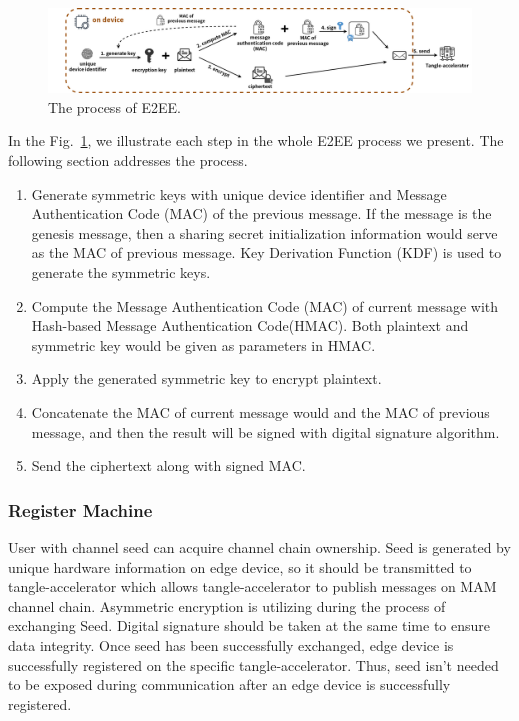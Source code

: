 \documentclass[conference]{IEEEtran}
\begin{document}
\begin{figure}[!t]
    \centering
    \includegraphics[width=\linewidth]{MAM_E2EE}
    \caption{The process of E2EE.}
    \label{fig:MAM_E2EE}
\end{figure}

In the Fig.~\ref{fig:MAM_E2EE}, we illustrate each step in the whole E2EE process we present. The following section addresses the process.

\begin{enumerate}
    \item Generate symmetric keys with unique device identifier and Message Authentication Code (MAC) of the previous message. If the message is the genesis message, then a sharing secret initialization information would serve as the MAC of previous message. Key Derivation Function (KDF) is used to generate the symmetric keys.
    \item Compute the Message Authentication Code (MAC) of current message with Hash-based Message Authentication Code(HMAC). Both plaintext and symmetric key would be given as parameters in HMAC.
    \item Apply the generated symmetric key to encrypt plaintext.
    \item Concatenate the MAC of current message would and the MAC of previous message, and then the result will be signed with digital signature algorithm.
    \item Send the ciphertext along with signed MAC.
\end{enumerate}

\subsubsection{Register Machine}
User with channel seed can acquire channel chain ownership. Seed is generated by unique hardware information on edge device, so it should be transmitted to tangle-accelerator which allows tangle-accelerator to publish messages on MAM channel chain. Asymmetric encryption is utilizing during the process of exchanging Seed. Digital signature should be taken at the same time to ensure data integrity. Once seed has been successfully exchanged, edge device is successfully registered on the specific tangle-accelerator. Thus, seed isn't needed to be exposed during communication after an edge device is successfully registered.
\end{document}
